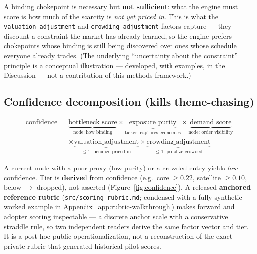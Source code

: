 \documentclass[11pt]{article}
\begin{document}
A binding chokepoint is necessary but \textbf{not sufficient}: what the engine must score is how much
of the scarcity is \emph{not yet priced in}. This is what the \texttt{valuation\_adjustment} and
\texttt{crowding\_adjustment} factors capture --- they discount a constraint the market has already
learned, so the engine prefers chokepoints whose binding is still being discovered over ones whose
schedule everyone already trades. (The underlying ``uncertainty about the constraint'' principle is a
conceptual illustration --- developed, with examples, in the Discussion --- not a contribution of this
methods framework.)

\subsection{Confidence decomposition (kills theme-chasing)}

\[
\begin{aligned}
\text{confidence} = {}&\underbrace{\text{bottleneck\_score}}_{\text{node: how binding}}
  \times \underbrace{\text{exposure\_purity}}_{\text{ticker: captures economics}}
  \times \underbrace{\text{demand\_score}}_{\text{node: order visibility}} \\
  &\times \underbrace{\text{valuation\_adjustment}}_{\le 1\text{: penalize priced-in}}
  \times \underbrace{\text{crowding\_adjustment}}_{\le 1\text{: penalize crowded}}
\end{aligned}
\]

A correct node with a poor proxy (low purity) or a crowded entry yields \emph{low} confidence.
Tier is \textbf{derived} from confidence (e.g.\ core $\geq 0.22$, satellite $\geq 0.10$, below
$\to$ dropped), not asserted (Figure~\ref{fig:confidence}). A released \textbf{anchored
reference rubric} (\texttt{src/scoring\_rubric.md}; condensed with a fully
synthetic worked example in Appendix~\ref{app:rubric-walkthrough}) makes forward and adopter
scoring inspectable --- a discrete anchor scale with a conservative straddle rule, so two
independent readers derive the same factor vector and tier. It is a post-hoc public
operationalization, not a reconstruction of the exact private rubric that generated historical
pilot scores.
\end{document}
